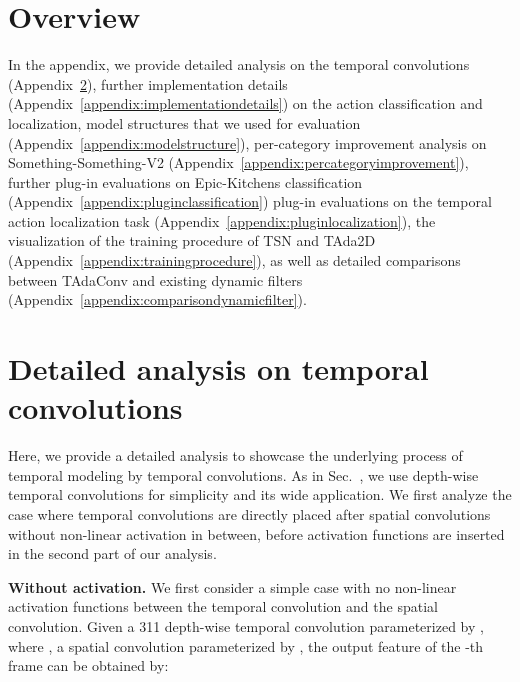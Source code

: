 \documentclass[10pt,journal,compsoc]{IEEEtran}
\def\x{}
\begin{document}

























\appendices
\section{Overview}
\renewcommand{\thetable}{A\arabic{table}}
\renewcommand{\thefigure}{A\arabic{figure}}
\setcounter{figure}{0}
\setcounter{table}{0}
In the appendix, we provide detailed analysis on the temporal convolutions (Appendix~\ref{appendix:tempconvs}), further implementation details (Appendix~\ref{appendix:implementationdetails}) on the action classification and localization, model structures that we used for evaluation (Appendix~\ref{appendix:modelstructure}), per-category improvement analysis on Something-Something-V2 (Appendix~\ref{appendix:percategoryimprovement}), further plug-in evaluations on Epic-Kitchens classification (Appendix~\ref{appendix:pluginclassification}) plug-in evaluations on the temporal action localization task (Appendix~\ref{appendix:pluginlocalization}), the visualization of the training procedure of TSN and TAda2D (Appendix~\ref{appendix:trainingprocedure}), as well as detailed comparisons between TAdaConv and existing dynamic filters (Appendix~\ref{appendix:comparisondynamicfilter}).

\section{Detailed analysis on temporal convolutions}
\label{appendix:tempconvs}
Here, we provide a detailed analysis to showcase the underlying process of temporal modeling by temporal convolutions. As in Sec.~{\color{forestgreen}{3.1}}, we use depth-wise temporal convolutions for simplicity and its wide application. We first analyze the case where temporal convolutions are directly placed after spatial convolutions without non-linear activation in between, before activation functions are inserted in the second part of our analysis. 


\textbf{Without activation. }We first consider a simple case with no non-linear activation functions between the temporal convolution and the spatial convolution. 
Given a 3\x1\x1 depth-wise temporal convolution parameterized by , where , a spatial convolution parameterized by , the output feature  of the -th frame can be obtained by:
\end{document}
